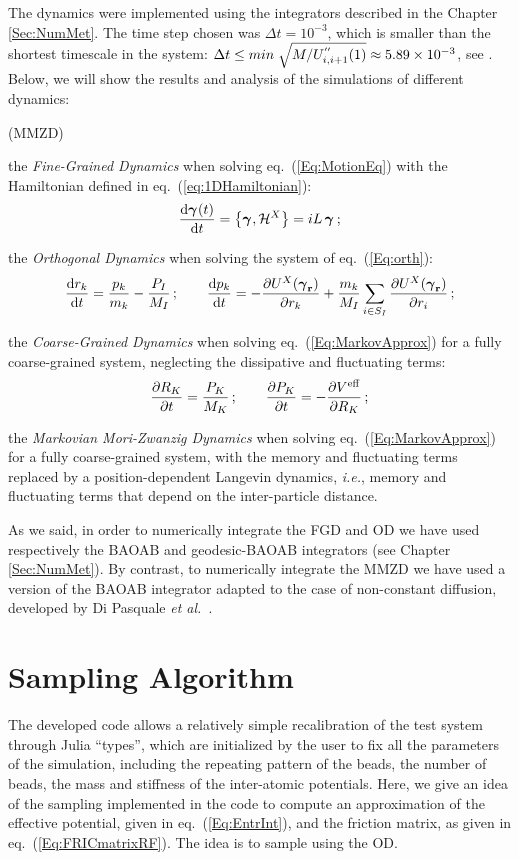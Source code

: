 \documentclass[10pt,a4paper]{book}
\theoremstyle{definition}
\begin{document}
The dynamics were implemented using the integrators described in the Chapter \ref{Sec:NumMet}. The time step chosen was $\Delta t=10^{-3}$, which is smaller than the shortest timescale in the system: $\Delta t \leq min\;\sqrt{M/U^{''}_{i,i+1}(1)}\approx 5.89 \times 10^{-3}$, see \cite{DiPasquale2019}.   
Below, we will show the results and analysis of the simulations of different dynamics:
\begin{labeling}{(MMZD)}
\item[(FGD)] the \emph{Fine-Grained Dynamics} when solving eq.~(\ref{Eq:MotionEq}) with the Hamiltonian defined in eq.~(\ref{eq:1DHamiltonian}):
 \[
 \frac{\mbox{d}\boldsymbol\gamma_{}(t)}{\mbox{d}t} = \left\lbrace \boldsymbol\gamma_{},\mathcal{H}^X\right\rbrace = iL\,\boldsymbol\gamma_{}\,;
 \]
\item[(OD)] the \emph{Orthogonal Dynamics} when solving the system of eq.~(\ref{Eq:orth}):
 \[
  \frac{\mbox{d}r_k}{\mbox{d}t} = \frac{p_k}{m_{k}}- \frac{P_I}{M_I} \,;\qquad
  \frac{\mbox{d}p_k}{\mbox{d}t} = - \frac{\partial U^X(\boldsymbol\gamma_{\mathbf{r}})}{\partial r_k} + \frac{m_k}{M_I}\sum_{i\in S_I}\frac{\partial U^X(\boldsymbol\gamma_{\mathbf{r}})}{\partial r_i}\,; 
 \]
\item[(CGD)] the \emph{Coarse-Grained Dynamics} when solving eq.~(\ref{Eq:MarkovApprox}) for a fully coarse-grained system, neglecting the dissipative and fluctuating terms:
 \[
 \frac{\partial R_{K}}{\partial t} = \frac{P_{K}}{M_{K}}\,; \qquad
 \frac{\partial P_{K}}{\partial t} = -\frac{\partial V^{\mathrm{eff}}}{\partial R_{K}}\,;  
 \]
\item[(MMZD)] the \emph{Markovian Mori-Zwanzig Dynamics} when solving eq.~(\ref{Eq:MarkovApprox}) for a fully coarse-grained system, with the memory and fluctuating terms replaced by a position-dependent Langevin dynamics, \textit{i.e.}, memory and fluctuating terms that depend on the inter-particle distance.
\end{labeling}
As we said, in order to numerically integrate the FGD and OD we have used respectively the BAOAB and geodesic-BAOAB integrators (see Chapter \ref{Sec:NumMet}). By contrast, to numerically integrate the MMZD we have used a version of the BAOAB integrator adapted to the case of non-constant diffusion, developed by Di Pasquale \textit{et al.}~\cite{DiPasquale2019}. 

\section{Sampling Algorithm}

The developed code allows a relatively simple recalibration of the test system through Julia ``types'', which are initialized by the user to fix all the parameters of the simulation, including the repeating pattern of the beads, the number of beads, the mass and stiffness of the inter-atomic potentials.
Here, we give an idea of the sampling implemented in the code to compute an approximation of the effective potential, given in eq.~(\ref{Eq:EntrInt}), and the friction matrix, as given in eq.~(\ref{Eq:FRICmatrixRF}). The idea is to sample using the OD.
\end{document}
